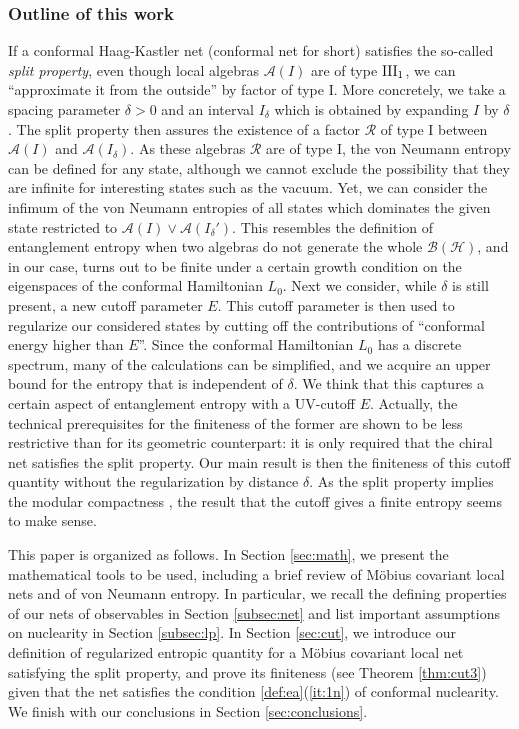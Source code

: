 \documentclass[a4paper,12pt]{article}
\theoremstyle{plain}
\theoremstyle{definition}
\theoremstyle{remark}
\def\A{{\mathcal A}}
\def\B{{\mathcal B}}
\def\H{{\mathcal H}}
\def\R{{\mathcal R}}
\def\R{{\mathcal R}}
\begin{document}
\subsubsection*{Outline of this work}
If a conformal Haag-Kastler net (conformal net for short) satisfies the so-called \emph{split property},
even though local algebras $\A(I)$ are of type ${\rm III_1}$, we can ``approximate it from the outside'' by factor of type I.
More concretely, we take a spacing parameter $\delta>0$ and an interval $I_\delta$ which is obtained by expanding $I$ by $\delta$.
The split property then assures the existence of a factor $\R$ of type I between $\A(I)$
and $\A(I_\delta)$. As these algebras $\R$ are of type I, the von Neumann entropy can be defined for any state,
although we cannot exclude the possibility that they are infinite for interesting states such as the vacuum.
Yet, we can consider the infimum of the von Neumann entropies of all states which dominates the given state
restricted to $\A(I)\vee \A(I_\delta')$. This resembles the definition of entanglement entropy when
two algebras do not generate the whole $\B(\H)$, and in our case, turns out to be finite under a certain growth condition on the eigenspaces of the conformal Hamiltonian $L_0$. %
Next we consider, while $\delta$ is still present, a new cutoff parameter $E$.
This cutoff parameter is then used to regularize our considered states by cutting off the contributions of ``conformal energy higher than $E$''.
Since the conformal Hamiltonian $L_0$ has a discrete spectrum, many of the calculations can be simplified,
and we acquire an upper bound for the entropy that is independent of $\delta$.
We think that this captures a certain aspect of entanglement entropy with a UV-cutoff $E$.
Actually, the technical prerequisites for the finiteness of the former are shown to be less restrictive
than for its geometric counterpart: it is only required that the chiral net satisfies the split property.
Our main result is then the finiteness of this cutoff quantity without the regularization by distance $\delta$.
As the split property implies the modular compactness \cite{bdl90a}, the result that the cutoff gives
a finite entropy seems to make sense.


This paper is organized as follows.
In Section \ref{sec:math}, we present the mathematical tools to be used,
including a brief review of M\"obius covariant local nets and of von Neumann entropy.
In particular, we recall the defining properties of our nets of observables in Section \ref{subsec:net}
and list important assumptions on nuclearity in Section \ref{subsec:lp}.
In Section \ref{sec:cut}, we introduce our definition of regularized entropic quantity for a M\"obius covariant local net
satisfying the split property, and prove its finiteness (see Theorem \ref{thm:cut3}) given that the net satisfies the condition
\ref{def:ea}(\ref{it:1n}) of conformal nuclearity. We finish with our conclusions in Section \ref{sec:conclusions}.
\end{document}
